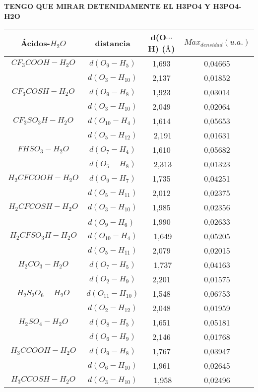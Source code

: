 {\bfseries TENGO QUE MIRAR DETENIDAMENTE EL H3PO4 Y H3PO4-H2O}

\begin{table}[H]
	\centering
	\begin{tabular}{|c|c|c|c|}
		\hline
		Ácidos-$H_2O$ & distancia	& d(O$\cdots$H) ($\mbox{\normalfont\AA}$) & $Max_{densidad} (u. a.)$ \\ \hline
		$CF_3COOH-H_2O$ & $d(O_9-H_5)$ &1,693&0,04665\\ \cline{2-4}
& $d(O_3-H_{10})$ & 2,137 & 0,01852 \\ \hline
 $CF_3COSH-H_2O$ & $d(O_9-H_8)$	 & 1,923 & 0,03014 \\ \cline{2-4}
	& $d(O_3-H_{10})$ & 2,049 & 0,02064 \\ \hline
	$CF_3SO_3H-H_2O$ & $d(O_{10}-H_4)$ & ﻿1,614 & 0,05653 \\ \cline{2-4}
	& $d(O_5-H_{12})$	&﻿ 2,191 &	0,01631 \\ \hline
 $FHSO_3-H_2O$	& $d(O_7-H_4)$ & 1,610 &	0,05682 \\ \cline{2-4}
	& $d(O_5-H_8)$	&﻿ 2,313	& 0,01323 \\ \hline
 $H_2CFCOOH-H_2O$	&$d(O_9-H_7)$ & 1,735	& 0,04251 \\ \cline{2-4}
	& $d(O_5-H_{11})$ & 2,012	& 0,02375 \\ \hline
 $H_2CFCOSH-H_2O$ &	$d(O_3-H_{10})$ & 1,985 &	0,02356 \\ \cline{2-4}
	& $d(O_9-H_6)$ ﻿& 1,990	& 0,02633 \\ \hline
 $H_2CFSO_3H-H_2O$ &	$d(O_{10}-H_4)$	&﻿ 1,649	& 0,05205 \\ \cline{2-4}
	& $d(O_5-H_{11})$ & 2,079	& 0,02015 \\ \hline
 $H_2CO_3-H_2O$	& $d(O_7-H_5)$	&﻿ 1,737	& 0,04163 \\ \cline{2-4}
	& $d(O_2-H_9)$ & 2,201	& 0,01575 \\ \hline
 $H_2S_2O_6-H_2O$ &	$d(O_{11}-H_{10})$	& ﻿1,548 &	0,06753 \\ \cline{2-4}
	& $d(O_2-H_{12})$ & 2,048 &	0,01959 \\ \hline
 $H_2SO_4-H_2O$	& $d(O_8-H_5)$ & 1,651	& 0,05181 \\ \cline{2-4}
	& $d(O_6-H_9)$ & 2,146	& 0,01768 \\ \hline
 $H_3CCOOH-H_2O$ & $d(O_9-H_8)$ & 1,767	& 0,03947 \\ \cline{2-4}
	& $d(O_6-H_{10})$ & 1,961 &	0,02645 \\ \hline
 $H_3CCOSH-H_2O$ &	$d(O_3-H_{10})$	&﻿ 1,958 &	0,02496 \\ \cline{2-4}

\end{tabular}
\end{table}
